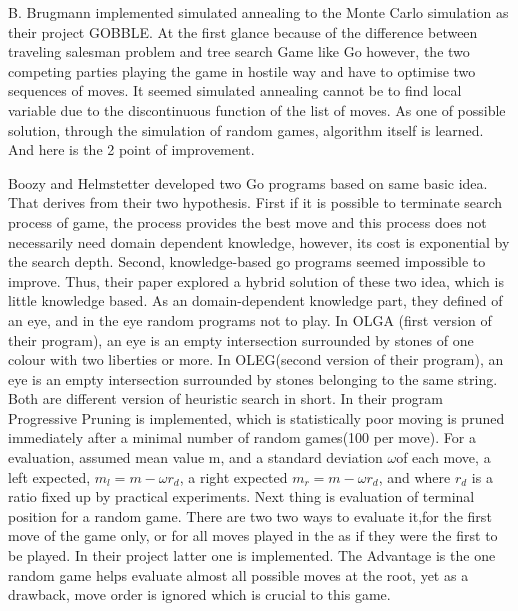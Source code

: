 \documentclass[11pt]{article}
\begin{document}
B. Brugmann implemented simulated annealing to the Monte Carlo simulation as their project GOBBLE\cite{brugmann1993monte}. At the first glance because of the difference between traveling salesman problem and tree search Game like Go however, the two competing parties playing the game in hostile way and have to optimise two sequences of moves. It seemed simulated annealing cannot be to find local variable due to the discontinuous function of the list of moves. As one of possible solution, through the simulation of random games, algorithm itself is learned. And here is the 2 point of improvement. 

Boozy and Helmstetter developed two Go programs based on same basic idea\cite{bouzy2004monte}. That derives from their two hypothesis. First if it is possible to terminate search process of game, the process provides the best move and this process does not necessarily need domain dependent knowledge, however, its cost is exponential by the search depth. Second, knowledge-based go programs seemed impossible to improve. Thus, their paper explored a hybrid solution of these two idea, which is little knowledge based. As an domain-dependent knowledge part, they defined of an {eye}, and in the {eye} random programs not to play. In OLGA (first version of their program), {an eye is an empty intersection surrounded by stones of one colour with two liberties or more.}
In OLEG(second version of their program), {an eye is an empty intersection surrounded by stones belonging to the same string.} Both are different version of heuristic search in short. In their program Progressive Pruning is implemented, which is statistically poor moving is pruned immediately after a minimal number of random games(100 per move). For a evaluation, assumed mean value m, and a standard deviation \(\omega\)of each move, a left expected, \(m_{l} = m - \omega r_{d}\), a right expected \(m_{r} = m - {\omega} r_{d}\), and where \(r_{d}\) is a ratio fixed up by practical experiments. Next thing is evaluation of terminal position for a random game. There are two two ways to evaluate it,{for the first move of the game only}, or  {for all moves played in the as if they were the first to be played.} In their project latter one is implemented. The Advantage is the one random game helps evaluate almost all possible moves at the root, yet as a drawback, move order is ignored which is crucial to this game. 
\end{document}

